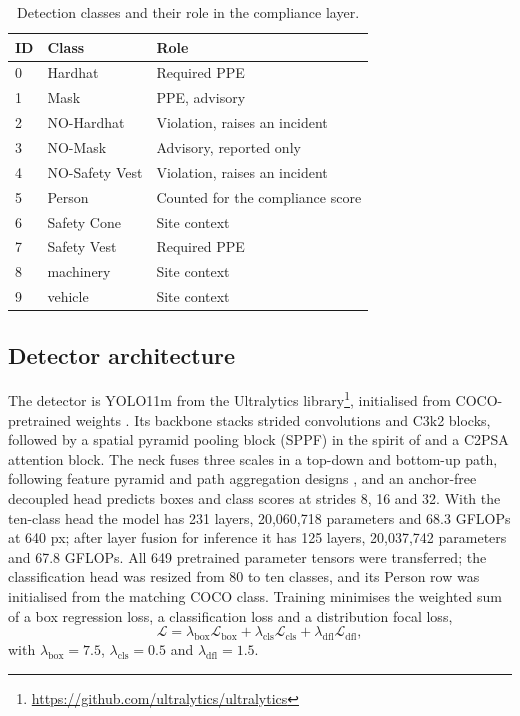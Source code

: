 \documentclass[preprint,12pt]{elsarticle}
\begin{document}
\begin{table}[htbp]
\centering
\small
\caption{Detection classes and their role in the compliance layer.}
\label{tab:classes}
\begin{tabular}{@{}lll@{}}
\toprule
ID & Class & Role \\
\midrule
0 & Hardhat & Required PPE \\
1 & Mask & PPE, advisory \\
2 & NO-Hardhat & Violation, raises an incident \\
3 & NO-Mask & Advisory, reported only \\
4 & NO-Safety Vest & Violation, raises an incident \\
5 & Person & Counted for the compliance score \\
6 & Safety Cone & Site context \\
7 & Safety Vest & Required PPE \\
8 & machinery & Site context \\
9 & vehicle & Site context \\
\bottomrule
\end{tabular}
\end{table}

\subsection{Detector architecture}

The detector is YOLO11m from the Ultralytics library\footnote{\url{https://github.com/ultralytics/ultralytics}}, initialised from COCO-pretrained weights \cite{lin2014coco}. Its backbone stacks strided convolutions and C3k2 blocks, followed by a spatial pyramid pooling block (SPPF) in the spirit of \cite{he2015spp} and a C2PSA attention block. The neck fuses three scales in a top-down and bottom-up path, following feature pyramid and path aggregation designs \cite{lin2017fpn,liu2018panet}, and an anchor-free decoupled head predicts boxes and class scores at strides 8, 16 and 32. With the ten-class head the model has 231 layers, 20,060,718 parameters and 68.3 GFLOPs at 640 px; after layer fusion for inference it has 125 layers, 20,037,742 parameters and 67.8 GFLOPs. All 649 pretrained parameter tensors were transferred; the classification head was resized from 80 to ten classes, and its Person row was initialised from the matching COCO class. Training minimises the weighted sum of a box regression loss, a classification loss and a distribution focal loss,
\begin{equation}
\mathcal{L} = \lambda_{\text{box}} \mathcal{L}_{\text{box}} + \lambda_{\text{cls}} \mathcal{L}_{\text{cls}} + \lambda_{\text{dfl}} \mathcal{L}_{\text{dfl}},
\label{eq:loss}
\end{equation}
with $\lambda_{\text{box}} = 7.5$, $\lambda_{\text{cls}} = 0.5$ and $\lambda_{\text{dfl}} = 1.5$.
\end{document}
